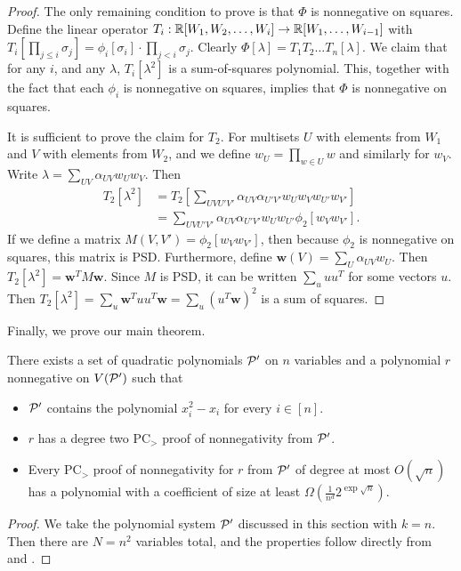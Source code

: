 \begin{proof}
The only remaining condition to prove is that $\Phi$ is nonnegative on squares. Define the linear operator $T_i: \mathbb R[W_1, W_2,\dots,W_i] \rightarrow \mathbb R[W_1,\dots,W_{i-1}]$ with $T_i[\prod_{j\leq i} \sigma_j] = \phi_i[\sigma_i] \cdot \prod_{j < i} \sigma_j$. Clearly $\Phi[\lambda] = T_1T_2\dots T_n[\lambda]$. We claim that for any $i$, and any $\lambda$, $T_i[\lambda^2]$ is a sum-of-squares polynomial. This, together with the fact that each $\phi_i$ is nonnegative on squares, implies that $\Phi$ is nonnegative on squares.

It is sufficient to prove the claim for $T_2$. For multisets $U$ with elements from $W_1$ and $V$ with elements from $W_2$, and we define $w_U = \prod_{w \in U} w$ and similarly for $w_V$. Write $\lambda = \sum_{UV} \alpha_{UV}w_Uw_V$. Then
\begin{align*}
T_2[\lambda^2] &= T_2\left[\sum_{UVU'V'} \alpha_{UV}\alpha_{U'V'} w_Uw_Vw_{U'}w_{V'}\right] \\
&= \sum_{UVU'V'} \alpha_{UV}\alpha_{U'V'}w_{U}w_{U'}\phi_2[w_Vw_{V'}].
\end{align*}
If we define a matrix $M(V,V') = \phi_2[w_Vw_{V'}]$, then because $\phi_2$ is nonnegative on squares, this matrix is PSD. Furthermore, define $\mathbf{w}(V) = \sum_U \alpha_{UV}w_U$. Then $T_2[\lambda^2] = \mathbf{w}^TM\mathbf{w}$. Since $M$ is PSD, it can be written $\sum_u uu^T$ for some vectors $u$. Then $T_2[\lambda^2] = \sum_u \mathbf{w}^Tuu^T\mathbf{w} = \sum_u (u^T\mathbf{w})^2$ is a sum of squares. 
\end{proof}

Finally, we prove our main theorem.
\begin{theorem}
There exists a set of quadratic polynomials $\mathcal P'$ on $n$ variables and a polynomial $r$ nonnegative on $V(\mathcal P')$ such that
\begin{itemize}
\item $\mathcal P'$ contains the polynomial $x_i^2 - x_i$ for every $i \in [n]$.
\item $r$ has a degree two PC$_>$ proof of nonnegativity from $\mathcal P'$. 
\item Every PC$_>$ proof of nonnegativity for $r$ from $\mathcal P'$ of degree at most $O(\sqrt{n})$ has a polynomial with a coefficient of size at least $\Omega(\frac{1}{n^d}2^{\exp \sqrt{n}})$.
\end{itemize}
\end{theorem}
\begin{proof}
We take the polynomial system $\mathcal P'$ discussed in this section with $k = n$. Then there are $N = n^2$ variables total, and the properties follow directly from  and .
\end{proof}